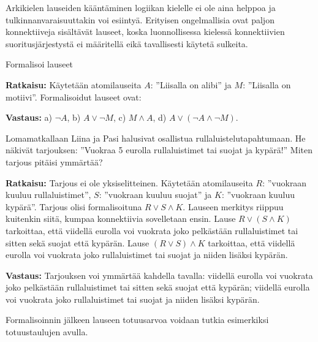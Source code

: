 Arkikielen lauseiden kääntäminen logiikan kielelle ei ole aina helppoa ja tulkinnanvaraisuuttakin voi esiintyä. Erityisen ongelmallisia ovat paljon konnektiiveja sisältävät lauseet, koska luonnollisessa kielessä konnektiivien suoritusjärjestystä ei määritellä eikä tavallisesti käytetä sulkeita.

\begin{esimerkki}
Formalisoi lauseet

{\bf Ratkaisu:}
Käytetään atomilauseita $A$: ''Liisalla on alibi'' ja $M$: ''Liisalla on motiivi''.	
Formalisoidut lauseet ovat:

{\bf Vastaus:}
a) $\lnot A$, b) $A \lor \lnot M$, c) $M\land A$, d) $A \lor (\lnot A \land \lnot M)$.
\end{esimerkki}

\begin{esimerkki}
Lomamatkallaan Liina ja Pasi halusivat osallistua rullaluistelutapahtumaan. He  näkivät tarjouksen: ''Vuokraa 5 eurolla rullaluistimet tai suojat ja kypärä!'' Miten tarjous pitäisi ymmärtää?

{\bf Ratkaisu:}
Tarjous ei ole yksiselitteinen. Käytetään atomilauseita $R$: ''vuokraan kuuluu rullaluistimet'', $S$: ''vuokraan kuuluu suojat'' ja $K$: ''vuokraan kuuluu kypärä''. Tarjous olisi formalisoituna $R\lor S \land K$. Lauseen merkitys riippuu kuitenkin siitä, kumpaa	konnektiivia sovelletaan ensin. Lause $R\lor (S\land K)$ tarkoittaa, että viidellä eurolla voi vuokrata joko pelkästään rullaluistimet tai sitten sekä suojat että kypärän. Lause $(R\lor S)\land K$ tarkoittaa, että viidellä eurolla voi vuokrata joko rullaluistimet tai suojat ja niiden lisäksi kypärän. 

{\bf Vastaus:} Tarjouksen voi ymmärtää kahdella tavalla:
viidellä eurolla voi vuokrata joko pelkästään rullaluistimet tai sitten sekä suojat että kypärän; viidellä eurolla voi vuokrata joko rullaluistimet tai suojat ja niiden lisäksi kypärän.
\end{esimerkki}

Formalisoinnin jälkeen lauseen totuusarvoa voidaan tutkia esimerkiksi totuustaulujen avulla.

